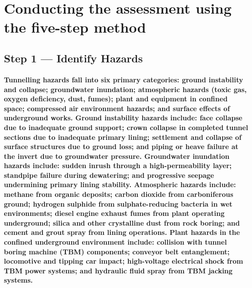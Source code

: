 \begin{itemize}
\end{itemize}

\section{Conducting the assessment using the five-step method}

\subsection{Step 1 --- Identify Hazards}
\paragraph{Tunnelling hazards fall into six primary categories: ground instability and collapse; groundwater inundation; atmospheric hazards (toxic gas, oxygen deficiency, dust, fumes); plant and equipment in confined space; compressed air environment hazards; and surface effects of underground works. Ground instability hazards include: face collapse due to inadequate ground support; crown collapse in completed tunnel sections due to inadequate primary lining; settlement and collapse of surface structures due to ground loss; and piping or heave failure at the invert due to groundwater pressure. Groundwater inundation hazards include: sudden inrush through a high-permeability layer; standpipe failure during dewatering; and progressive seepage undermining primary lining stability. Atmospheric hazards include: methane from organic deposits; carbon dioxide from carboniferous ground; hydrogen sulphide from sulphate-reducing bacteria in wet environments; diesel engine exhaust fumes from plant operating underground; silica and other crystalline dust from rock boring; and cement and grout spray from lining operations. Plant hazards in the confined underground environment include: collision with tunnel boring machine (TBM) components; conveyor belt entanglement; locomotive and tipping car impact; high-voltage electrical shock from TBM power systems; and hydraulic fluid spray from TBM jacking systems.}

